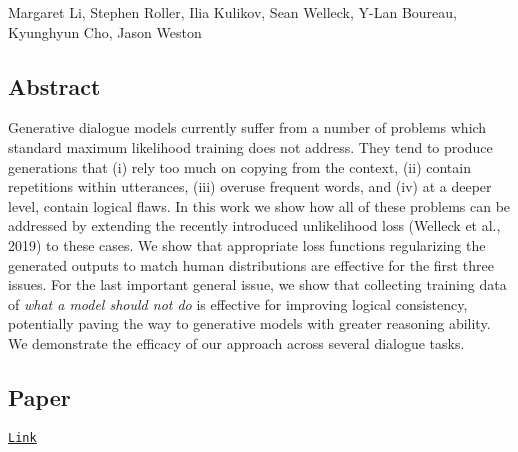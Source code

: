 Margaret Li, Stephen Roller, Ilia Kulikov, Sean Welleck, Y-\/\+Lan Boureau, Kyunghyun Cho, Jason Weston

\subsection*{Abstract}

Generative dialogue models currently suffer from a number of problems which standard maximum likelihood training does not address. They tend to produce generations that (i) rely too much on copying from the context, (ii) contain repetitions within utterances, (iii) overuse frequent words, and (iv) at a deeper level, contain logical flaws. In this work we show how all of these problems can be addressed by extending the recently introduced unlikelihood loss (Welleck et al., 2019) to these cases. We show that appropriate loss functions regularizing the generated outputs to match human distributions are effective for the first three issues. For the last important general issue, we show that collecting training data of {\itshape what a model should not do} is effective for improving logical consistency, potentially paving the way to generative models with greater reasoning ability. We demonstrate the efficacy of our approach across several dialogue tasks.

\subsection*{Paper}

\href{https://drive.google.com/open?id=1Du-FhnApmH_72gqWnnQyjigKDpmN9mBI}{\tt Link} 